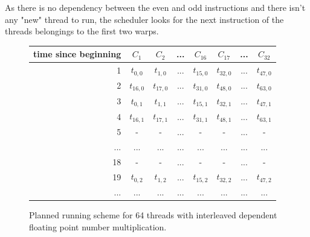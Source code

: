 \documentclass{report}
\begin{document}
As there is no dependency between the even and odd instructions and there isn't any "new" thread to run, the scheduler looks for the next instruction of the threads belongings to the first two warps.
\begin{figure}[H]
      \centering
       \begin{tabular}{ | r || c | c | c | c || c | c | c | }
    	    \hline
    	    time since beginning & $C_1$ & $C_2$ & ... & $C_{16}$ & $C_{17}$ & ... & $C_{32}$ \\ \hline  \hline
    	   1 & $t_{0,0}$ & $t_{1,0}$ & ... & $t_{15,0}$ & $t_{32, 0}$ & ... & $t_{47, 0}$ \\ \hline 
    	   2 & $t_{16,0}$ & $t_{17,0}$ & ... & $t_{31,0}$ & $t_{48, 0}$ & ... & $t_{63, 0}$ \\ \hline
    	   3 & $t_{0,1}$ & $t_{1,1}$ & ... & $t_{15,1}$ & $t_{32, 1}$ & ... & $t_{47, 1}$ \\ \hline
           4 & $t_{16,1}$ & $t_{17,1}$ & ... & $t_{31,1}$ & $t_{48, 1}$ & ... & $t_{63, 1}$ \\ \hline
    	   5 & - & - & ... & - & - & ... & - \\ \hline
    	   ... & ... & ... & ... & ... & ... & ... & ... \\ \hline
    	   18 & - & - & ... & - & - & ... & - \\ \hline
    	   19 & $t_{0,2}$ & $t_{1,2}$ & ... & $t_{15,2}$ & $t_{32,2}$ & ... & $t_{47,2}$ \\ \hline
    	   ... & ... & ... & ... & ... & ... & ... & ... \\ \hline
  	\end{tabular}
  	\captionsetup{justification=centering}
  	\caption{Planned running scheme for 64 threads with interleaved dependent floating point number multiplication.}
  	\label{fig:fp_prediction_64_halfdep}
   \end{figure}
   
   {}
   
\end{document}
